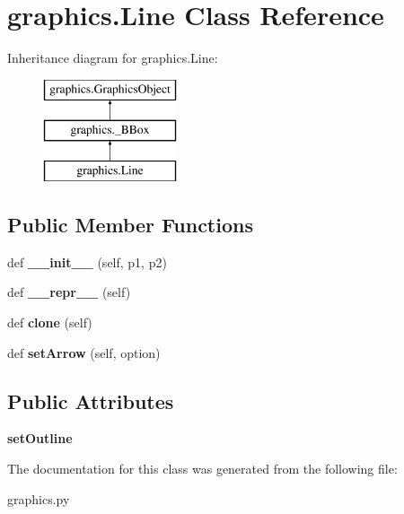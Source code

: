 \hypertarget{classgraphics_1_1_line}{}\section{graphics.\+Line Class Reference}
\label{classgraphics_1_1_line}
Inheritance diagram for graphics.\+Line\+:\begin{figure}[H]
\begin{center}
\leavevmode
\includegraphics[height=3.000000cm]{classgraphics_1_1_line}
\end{center}
\end{figure}
\subsection*{Public Member Functions}
\begin{DoxyCompactItemize}
\item 
def {\bfseries \+\_\+\+\_\+init\+\_\+\+\_\+} (self, p1, p2)\hypertarget{classgraphics_1_1_line_a8aab9ed90de9a987a2ea6446caca2188}{}\label{classgraphics_1_1_line_a8aab9ed90de9a987a2ea6446caca2188}

\item 
def {\bfseries \+\_\+\+\_\+repr\+\_\+\+\_\+} (self)\hypertarget{classgraphics_1_1_line_a9f0196b56e225e7c1688b55486848ad5}{}\label{classgraphics_1_1_line_a9f0196b56e225e7c1688b55486848ad5}

\item 
def {\bfseries clone} (self)\hypertarget{classgraphics_1_1_line_a2691c6ba64cfb04f32a585d40f1a7e1e}{}\label{classgraphics_1_1_line_a2691c6ba64cfb04f32a585d40f1a7e1e}

\item 
def {\bfseries set\+Arrow} (self, option)\hypertarget{classgraphics_1_1_line_aef621dc2bfe50449ac764fda18ede3b6}{}\label{classgraphics_1_1_line_aef621dc2bfe50449ac764fda18ede3b6}

\end{DoxyCompactItemize}
\subsection*{Public Attributes}
\begin{DoxyCompactItemize}
\item 
{\bfseries set\+Outline}\hypertarget{classgraphics_1_1_line_a2462ca216d643515e7956d8e3688bf44}{}\label{classgraphics_1_1_line_a2462ca216d643515e7956d8e3688bf44}

\end{DoxyCompactItemize}


The documentation for this class was generated from the following file\+:\begin{DoxyCompactItemize}
\item 
graphics.\+py\end{DoxyCompactItemize}
